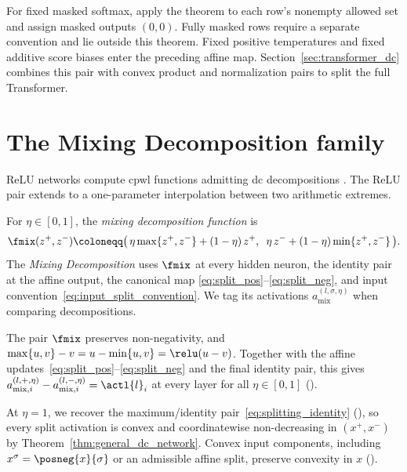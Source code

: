 For fixed masked softmax, apply the theorem to each row's nonempty allowed set and assign masked outputs $(0,0)$. Fully masked rows require a separate convention and lie outside this theorem. Fixed positive temperatures and fixed additive score biases enter the preceding affine map. Section~\ref{sec:transformer_dc} combines this pair with convex product and normalization pairs to split the full Transformer.

\section{The Mixing Decomposition family}\label{sec:mixing_decomposition}

ReLU networks compute \ac{cpwl} functions \parencite{Arora2018} admitting \ac{dc} decompositions \parencite{Melzer1986_PLasDC,Kripfganz1987_PWAasDC,hiddenMono}. The ReLU pair extends to a one-parameter interpolation between two arithmetic extremes.

\begin{definition}\label{def:fmix}
For $\eta \in [0,1]$, the \emph{mixing decomposition function} is
\begin{equation}
	\fmix(z^+, z^-) \coloneqq \bigl(\, \eta \max\{z^+, z^-\} + (1-\eta)\, z^+, \;\; \eta\, z^- + (1-\eta) \min\{z^+, z^-\} \,\bigr).
	\label{eq:fmix_def}
\end{equation}
The \emph{Mixing Decomposition} uses $\fmix$ at every hidden neuron, the identity pair at the affine output, the canonical map \eqref{eq:split_pos}--\eqref{eq:split_neg}, and input convention~\eqref{eq:input_split_convention}. We tag its activations $a_{\mathrm{mix}}^{(l,\sigma,\eta)}$ when comparing decompositions.
\end{definition}

The pair $\fmix$ preserves non-negativity, and $\max\{u,v\}-v=u-\min\{u,v\}=\relu(u-v)$. Together with the affine updates~\eqref{eq:split_pos}--\eqref{eq:split_neg} and the final identity pair, this gives $a_{\mathrm{mix},i}^{(l,+,\eta)}-a_{\mathrm{mix},i}^{(l,-,\eta)}=\actl{l}_i$ at every layer for all $\eta\in[0,1]$ ().

At $\eta=1$, we recover the maximum/identity pair~\eqref{eq:splitting_identity} (), so every split activation is convex and coordinatewise non-decreasing in $(x^+,x^-)$ by Theorem~\ref{thm:general_dc_network}. Convex input components, including $x^\sigma=\posneg{x}{\sigma}$ or an admissible affine split, preserve convexity in $x$ ().

